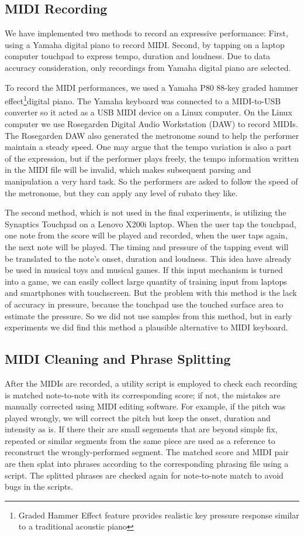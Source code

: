 \subsection{MIDI Recording}
We have implemented two methods to record an expressive performance: First, using a Yamaha digital piano to record MIDI. Second, by tapping on a laptop computer touchpad to express tempo, duration and loudness. Due to data accuracy consideration, only recordings from Yamaha digital piano are selected.


To record the MIDI performances, we used a Yamaha P80 88-key graded hammer effect\footnote{Graded Hammer Effect feature provides realistic key pressure response similar to a traditional acoustic piano}digital piano. The Yamaha keyboard was connected to a MIDI-to-USB  converter so it acted as a USB MIDI device on a Linux computer. On the Linux computer we use Rosegarden Digital Audio Workstation (DAW) to record MIDIs. The Rosegarden DAW also generated the metronome sound to help the performer maintain a steady speed. One may argue that the tempo variation is also a part of the expression, but if the performer plays freely, the tempo information written in the MIDI file will be invalid, which makes subsequent parsing and manipulation a very hard task. So the performers are asked to follow the speed of the metronome, but they can apply any level of rubato they like. 

The second method, which is not used in the final experiments, is utilizing the Synaptics Touchpad on a Lenovo X200i laptop. When the user tap the touchpad, one note from the score will be played and recorded, when the user taps again, the next note will be played. The timing and pressure of the tapping event will be translated to the note's onset, duration and loudness. This idea have already be used in musical toys\cite{toyviolin} and musical games. If this input mechanism is turned into a game, we can easily collect large quantity of training input from laptops and smartphones with touchscreen. But the problem with this method is the lack of accuracy in pressure, because the touchpad use the touched surface area to estimate the pressure. So we did not use samples from this method, but in early experiments we did find this method a plausible alternative to MIDI keyboard.

\subsection{MIDI Cleaning and Phrase Splitting}
  After the MIDIs are recorded, a utility script is employed to check each recording is matched note-to-note with its corresponding score; if not, the mistakes are manually corrected using MIDI editing software. For example, if the pitch was played wrongly, we will correct the pitch but keep the onset, duration  and intensity as is. If there their are small segements that are beyond simple fix, repeated or similar segments from the same piece are used as a reference to reconstruct the wrongly-performed segment. The matched score and MIDI pair are then splat into phrases according to the corresponding phrasing file using a script. The splitted phrases are checked again for note-to-note match to avoid bugs in the scripts.

